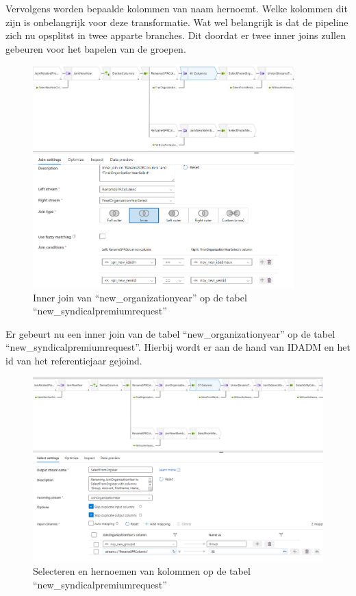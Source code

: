 Vervolgens worden bepaalde kolommen van naam hernoemt. Welke kolommen dit zijn is onbelangrijk voor deze transformatie. Wat wel belangrijk is dat de pipeline zich nu opsplitst in twee apparte branches. Dit doordat er twee inner joins zullen gebeuren voor het bapelen van de groepen.

\begin{figure}[H]
    \centering
    \includegraphics[width=0.9\textwidth]{./graphics/adf/bepalen_groep_4.png}
    \caption{Inner join van ``new\_organizationyear'' op de tabel ``new\_syndicalpremiumrequest''}
\end{figure}

Er gebeurt nu een inner join van de tabel ``new\_organizationyear'' op de tabel ``new\_syndicalpremiumrequest''. Hierbij wordt er aan de hand van IDADM en het id van het referentiejaar gejoind.

\begin{figure}[H]
    \centering
    \includegraphics[width=1\textwidth]{./graphics/adf/bepalen_groep_5.png}
    \caption{Selecteren en hernoemen van kolommen op de tabel ``new\_syndicalpremiumrequest''}
\end{figure}

